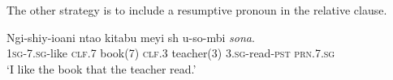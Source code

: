 The other strategy is to include a resumptive pronoun in the relative clause.

\begin{exe}
\ex
\gll Ngi-shiy-ioani nta\textbeltl o kitabu meyi {sh\textramshorns} u-so-mbi \textit{sona}. \\
\textsc{1sg}-\textsc{7.sg}-like \textsc{clf.7} book(7) \textsc{clf.3} teacher(3) \textsc{3.sg}-read-\textsc{pst} \textsc{prn.7.sg} \\
\trans `I like the book that the teacher read.'
\end{exe}
